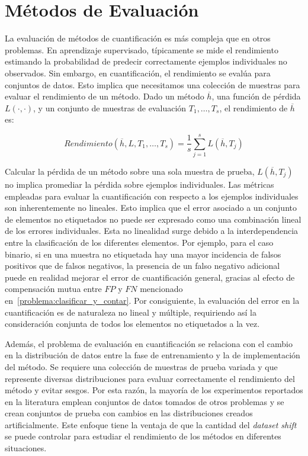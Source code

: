 \chapter{Métodos de Evaluación}\label{evaluacion}

La evaluación de métodos de cuantificación es más compleja que en otros
problemas. En aprendizaje supervisado, típicamente se mide el rendimiento
estimando la probabilidad de predecir correctamente ejemplos individuales no
observados. Sin embargo, en cuantificación, el rendimiento se evalúa para
conjuntos de datos. Esto implica que necesitamos una colección de muestras para
evaluar el rendimiento de un método. Dado un método $\overline{h}$, una función
de pérdida $L(\cdot, \cdot)$, y un conjunto de muestras de evaluación ${T_1,
\dots, T_s}$, el rendimiento de $\overline{h}$ es:

\begin{equation}
    Rendimiento(\overline{h}, L, {T_1, \dots , T_s}) = \frac{1}{s}
    \sum \limits_{j=1}^{s}L(\overline{h}, T_j)
    \label{ecuacion_rendimiento}
\end{equation}

Calcular la pérdida de un método sobre una sola muestra de prueba,
$L(\overline{h}, T_j)$ no implica promediar la pérdida sobre ejemplos
individuales. Las métricas empleadas para evaluar la cuantificación con respecto
a los ejemplos individuales son inherentemente no lineales. Esto implica que el
error asociado a un conjunto de elementos no etiquetados no puede ser expresado
como una combinación lineal de los errores individuales. Esta no linealidad
surge debido a la interdependencia entre la clasificación de los diferentes
elementos. Por ejemplo, para el caso binario, si en una muestra no etiquetada
hay una mayor incidencia de falsos positivos que de falsos negativos, la
presencia de un falso negativo adicional puede en realidad mejorar el error de
cuantificación general, gracias al efecto de compensación mutua entre $FP$ y
$FN$ mencionado en~\ref{problema:clasificar_y_contar}. Por consiguiente, la
evaluación del error en la cuantificación es de naturaleza no lineal y múltiple,
requiriendo así la consideración conjunta de todos los elementos no etiquetados
a la vez.

Además, el problema de evaluación en cuantificación se relaciona con el cambio
en la distribución de datos entre la fase de entrenamiento y la de
implementación del método. Se requiere una colección de muestras de prueba
variada y que represente diversas distribuciones para evaluar correctamente el
rendimiento del método y evitar sesgos. Por esta razón, la mayoría de los
experimentos reportados en la literatura emplean conjuntos de datos tomados de
otros problemas y se crean conjuntos de prueba con cambios en las distribuciones
creados artificialmente. Este enfoque tiene la ventaja de que la cantidad del
{\it dataset shift\/} se puede controlar para estudiar el rendimiento de los
métodos en diferentes situaciones.


